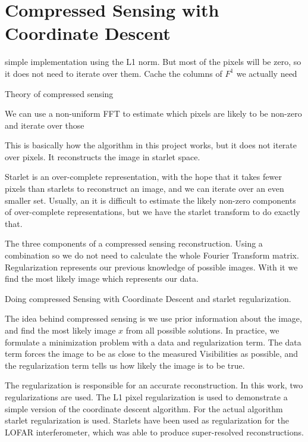 \section{Compressed Sensing with Coordinate Descent}\label{cd}
simple implementation using the L1 norm. But most of the pixels will be zero, so it does not need to iterate over them.
Cache the columns of $F^{1}$ we actually need

Theory of compressed sensing 

We can use a non-uniform FFT to estimate which pixels are likely to be non-zero and iterate over those


This is basically how the algorithm in this project works, but it does not iterate over pixels. It reconstructs the image in starlet space. 

Starlet is an over-complete representation, with the hope that it takes fewer pixels than starlets to reconstruct an image, and we can iterate over an even smaller set. Usually, an it is difficult to estimate the likely non-zero components of over-complete representations, but we have the starlet transform to do exactly that.





The three components of a compressed sensing reconstruction. Using a combination so we do not need to calculate the whole Fourier Transform matrix. Regularization represents our previous knowledge of possible images. With it we find the most likely image which represents our data.

Doing compressed Sensing with Coordinate Descent and starlet regularization.






The idea behind compressed sensing is we use prior information about the image, and find the most likely image $x$ from all possible solutions. In practice, we formulate a minimization problem with a data and regularization term. The data term forces the image to be as close to the measured Visibilities as possible, and the regularization term tells us how likely the image is to be true. 

The regularization is responsible for an accurate reconstruction. In this work, two regularizations are used. The L1 pixel regularization is used to demonstrate a simple version of the coordinate descent algorithm. For the actual algorithm starlet regularization is used. Starlets have been used as regularization for the LOFAR interferometer\cite{girard2015sparse}, which was able to produce super-resolved reconstructions.

